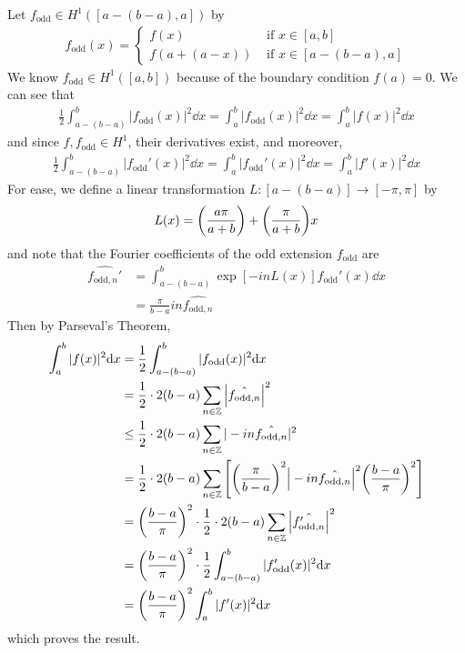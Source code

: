\documentclass[fontsize=11pt]{article} %
\theoremstyle{plain}
\numberwithin{equation}{section} %
\numberwithin{figure}{section} %
\numberwithin{table}{section} %
\begin{document}
Let $f_\text{odd} \in H^1([a-(b-a),a])$ by
\begin{align*}
    f_\text{odd}(x) = \begin{cases}
        f(x) & \text{ if } x \in [a,b] \\
        f(a + (a-x)) & \text{ if } x \in [a - (b-a), a]
    \end{cases}
\end{align*}
We know $f_\text{odd} \in H^1([a, b])$ because of the boundary condition $f(a) = 0$.  We can see that
\begin{align*}
    \frac{1}{2}\int_{a - (b-a)}^b |f_\text{odd}(x)|^2 \dd x = \int_a^b |f_\text{odd}(x)|^2 \dd x = \int_a^b |f(x)|^2 \dd x
\end{align*}
and since $f, f_\text{odd} \in H^1$, their derivatives exist, and moreover,
\begin{align*}
    \frac{1}{2}\int_{a - (b-a)}^b |f_\text{odd}'(x)|^2 \dd x = \int_a^b |f_\text{odd}'(x)|^2 \dd x = \int_a^b |f'(x)|^2 \dd x
\end{align*}
For ease, we define a linear transformation $L:[a - (b-a)] \rightarrow [-\pi, \pi]$ by
\begin{align*}
    L(x) = \qty(\frac{a\pi}{a+b}) + \qty(\frac{\pi}{a+b})x
\end{align*}
and note that the Fourier coefficients of the odd extension $f_\text{odd}$ are
\begin{align*}
    \hat{f_{\text{odd},n}'} &= \int_{a - (b-a)}^b \exp[-in L(x)]f_\text{odd}'(x)\dd x \\
    &= \frac{\pi}{b-a}in\hat{f_{\text{odd},n}}
\end{align*}
Then by Parseval's Theorem,
\begin{align*}
    \int_a^b|f(x)|^2\dd x &= \frac{1}{2}\int_{a-(b-a)}^b |f_\text{odd}(x)|^2\dd x\\
    &= \frac{1}{2}\cdot 2(b-a)\sum_{n\in\mathbb{Z}}\left|\hat{f_{\text{odd},n}}\right|^2 \\
    &\leq \frac{1}{2}\cdot 2(b-a)\sum_{n\in\mathbb{Z}}|-in\hat{f_{\text{odd},n}}|^2 \\
    &= \frac{1}{2}\cdot 2(b-a)\sum_{n\in\mathbb{Z}}\qty[\qty(\frac{\pi}{b-a})^2\Big|-in\hat{f_{\text{odd},n}}\Big|^2\qty(\frac{b-a}{\pi})^2] \\
    &= \qty(\frac{b-a}{\pi})^2\cdot \frac{1}{2}\cdot 2(b-a)\sum_{n\in\mathbb{Z}}\Big|\hat{f_{\text{odd},n}'}\Big|^2 \\
    &= \qty(\frac{b-a}{\pi})^2\cdot\frac{1}{2}\int_{a-(b-a)}^b|f_\text{odd}'(x)|^2\dd x \\
    &= \qty(\frac{b-a}{\pi})^2\int_a^b|f'(x)|^2\dd x
\end{align*}
which proves the result.
\end{document}
